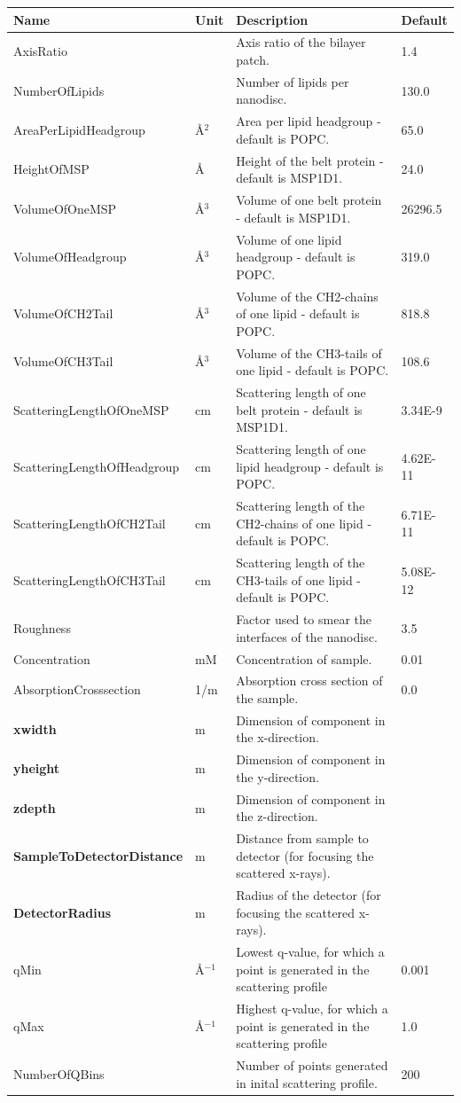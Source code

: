 \begin{longtable}{p{}p{}p{}p{}}
\toprule
\textbf{Name} & \textbf{Unit} & \textbf{Description} & \textbf{Default} \\
\midrule
\endhead
AxisRatio &  & Axis ratio of the bilayer patch. & 1.4 \\
NumberOfLipids &  & Number of lipids per nanodisc. & 130.0 \\
AreaPerLipidHeadgroup & \AA{}$^{2}$ & Area per lipid headgroup - default is POPC. & 65.0 \\
HeightOfMSP & \AA{} & Height of the belt protein - default is MSP1D1. & 24.0 \\
VolumeOfOneMSP & \AA{}$^{3}$ & Volume of one belt protein - default is MSP1D1. & 26296.5 \\
VolumeOfHeadgroup & \AA{}$^{3}$ & Volume of one lipid headgroup - default is POPC. & 319.0 \\
VolumeOfCH2Tail & \AA{}$^{3}$ & Volume of the CH2-chains of one lipid - default is POPC. & 818.8 \\
VolumeOfCH3Tail & \AA{}$^{3}$ & Volume of the CH3-tails of one lipid - default is POPC. & 108.6 \\
ScatteringLengthOfOneMSP & cm & Scattering length of one belt protein - default is MSP1D1. & 3.34E-9 \\
ScatteringLengthOfHeadgroup & cm & Scattering length of one lipid headgroup - default is POPC. & 4.62E-11 \\
ScatteringLengthOfCH2Tail & cm & Scattering length of the CH2-chains of one lipid - default is POPC. & 6.71E-11 \\
ScatteringLengthOfCH3Tail & cm & Scattering length of the CH3-tails of one lipid - default is POPC. & 5.08E-12 \\
Roughness &  & Factor used to smear the interfaces of the nanodisc. & 3.5 \\
Concentration & mM & Concentration of sample. & 0.01 \\
AbsorptionCrosssection & 1/m & Absorption cross section of the sample. & 0.0 \\
\textbf{xwidth} & m & Dimension of component in the x-direction. &  \\
\textbf{yheight} & m & Dimension of component in the y-direction. &  \\
\textbf{zdepth} & m & Dimension of component in the z-direction. &  \\
\textbf{SampleToDetectorDistance} & m & Distance from sample to detector (for focusing the scattered x-rays). &  \\
\textbf{DetectorRadius} & m & Radius of the detector (for focusing the scattered x-rays). &  \\
qMin & \AA{}$^{-1}$ & Lowest q-value, for which a point is generated in the scattering profile & 0.001 \\
qMax & \AA{}$^{-1}$ & Highest q-value, for which a point is generated in the scattering profile & 1.0 \\
NumberOfQBins &  & Number of points generated in inital scattering profile. & 200 \\
\bottomrule
\end{longtable}

